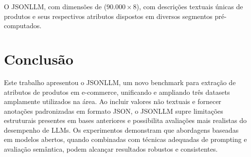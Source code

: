 O JSONLLM, com dimensões de ($90.000 \times 8$), com descrições textuais únicas de produtos e seus respectivos atributos dispostos em diversos segmentos pré-computados.


\section{Conclusão} %

Este trabalho apresentou o JSONLLM, um novo benchmark para extração de atributos de produtos em e-commerce, unificando e ampliando três datasets amplamente utilizados na área. Ao incluir valores não textuais e fornecer anotações padronizadas em formato JSON, o JSONLLM supre limitações estruturais presentes em bases anteriores e possibilita avaliações mais realistas do desempenho de LLMs. Os experimentos demonstram que abordagens baseadas em modelos abertos, quando combinadas com técnicas adequadas de prompting e avaliação semântica, podem alcançar resultados robustos e consistentes.










